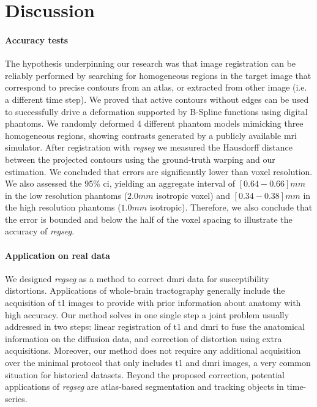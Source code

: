 \section{Discussion}
\label{sec:discussion}

\paragraph*{Accuracy tests}
The hypothesis underpinning our research was that image registration can be reliably performed
  by searching for homogeneous regions in the target image that correspond to precise contours
  from an atlas, or extracted from other image (i.e. a different time step).
We proved that active contours without edges can be used to successfully drive a
  deformation supported by B-Spline functions using digital phantoms.
We randomly deformed 4 different phantom models mimicking three homogeneous regions,
  showing contrasts generated by a publicly available \gls*{mri} simulator.
After registration with \emph{regseg} we measured the Hausdorff distance between the
  projected contours using the ground-truth warping and our estimation.
We concluded that errors are significantly lower than voxel resolution.
We also assessed the 95\% \gls*{ci}, yielding an aggregate interval of
  $[0.64 - 0.66]mm$ in the low resolution phantoms ($2.0mm$ isotropic voxel) and
  $[0.34 - 0.38]mm$ in the high resolution phantoms ($1.0mm$ isotropic).
Therefore, we also conclude that the error is bounded and below the half of the
  voxel spacing to illustrate the accuracy of \emph{regseg}.

\paragraph*{Application on real data}
We designed \emph{regseg} as a method to correct \gls*{dmri} data for susceptibility
  distortions.
Applications of whole-brain tractography generally include the acquisition of \gls*{t1} images
  to provide with prior information about anatomy with high accuracy.
Our method solves in one single step a joint problem usually addressed in two steps:
  linear registration of \gls*{t1} and \gls*{dmri} to fuse the anatomical information on
  the diffusion data, and correction of distortion using extra acquisitions.
Moreover, our method does not require any additional acquisition over the minimal protocol
  that only includes \gls*{t1} and \gls*{dmri} images, a very common situation for
  historical datasets.
Beyond the proposed correction, potential applications of \emph{regseg} are atlas-based
  segmentation and tracking objects in time-series.

